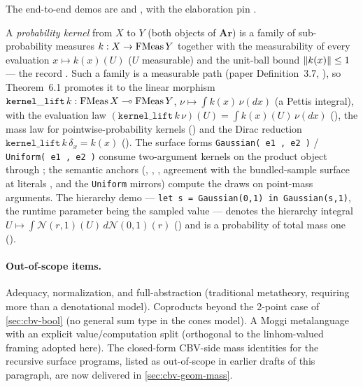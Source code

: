 The end-to-end demos are
 and
, with the elaboration
pin .

\begin{definition}\label{def:cbv-pkernel}
A \emph{probability kernel} from $X$ to $Y$ (both objects of
$\mathbf{Ar}$) is a family of sub-probability measures
$k : X \to \mathrm{FMeas}\,Y$ together with the measurability of every
evaluation $x \mapsto k(x)(U)$ ($U$ measurable) and the unit-ball
bound $\lVert k(x) \rVert \le 1$ --- the record
. Such a family is a
measurable path (paper Definition~3.7,
), so
Theorem~6.1 promotes it to the linear morphism
$\mathtt{kernel\_lift}\,k : \mathrm{FMeas}\,X \multimap \mathrm{FMeas}\,Y$,
$\nu \mapsto \int k(x)\,\nu(dx)$ (a Pettis integral), with the
evaluation law $(\mathtt{kernel\_lift}\,k\,\nu)(U) =
\int k(x)(U)\,\nu(dx)$
(), the mass law
for pointwise-probability kernels
() and the
Dirac reduction $\mathtt{kernel\_lift}\,k\,\delta_x = k(x)$
(). The
surface forms \texttt{Gaussian( e1 , e2 )} /
\texttt{Uniform( e1 , e2 )} consume two-argument kernels on the
product object through
; the semantic
anchors (,
,
,
agreement with the bundled-sample surface at literals
,
and the \texttt{Uniform} mirrors) compute the draws on point-mass
arguments. The hierarchy demo
 ---
\texttt{let s = Gaussian(0,1) in Gaussian(s,1)}, the runtime
parameter being the sampled value --- denotes the hierarchy integral
$U \mapsto \int \mathcal{N}(r,1)(U)\,d\mathcal{N}(0,1)(r)$
() and
is a probability of total mass one
().
\end{definition}

\paragraph{Out-of-scope items.}
Adequacy, normalization, and full-abstraction (traditional metatheory,
requiring more than a denotational model). Coproducts beyond the
2-point case of \autoref{sec:cbv-bool} (no general sum type in the
cones model). A Moggi metalanguage with an explicit value/computation
split (orthogonal to the linhom-valued framing adopted here). The
closed-form CBV-side mass identities for the recursive surface
programs, listed as out-of-scope in earlier drafts of this paragraph,
are now delivered in \autoref{sec:cbv-geom-mass}.

